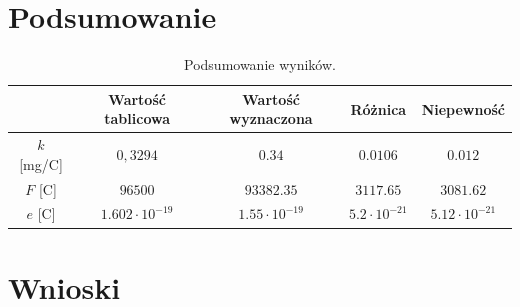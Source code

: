 \documentclass[a4paper,12pts]{article}
\begin{document}
	\newpage
	\section{Podsumowanie}
	
	\begin{table}[!h]
	\centering
	\begin{tabular}{ | c | c | c | c | c | }
		\hline
		\textrm{ } & \textrm{Wartość tablicowa}  & \textrm{Wartość wyznaczona} & \textrm{Różnica} & \textrm{Niepewność} \\ \hline
		\textrm{$k$ [mg/C]} & $0,3294$ & $0.34$ & $0.0106$ & $0.012$ \\ \hline
		\textrm{$F$ [C]} & $96500$ & $93382.35$ & $3117.65$ & $3081.62$ \\ \hline
		\textrm{$e$ [C]} & $1.602 \cdot 10^{-19}$ & $1.55 \cdot 10^{-19}$ & $5.2 \cdot 10^{-21}$ & $5.12 \cdot 10^{-21}$ \\ \hline
	\end{tabular}
	\caption{Podsumowanie wyników.}
	\label{Tabela1}	
	\end{table}
	
	
	\section{Wnioski}
	
	
\end{document}
